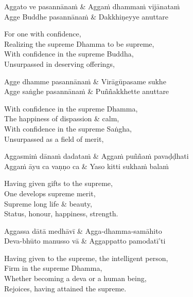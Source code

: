 \begin{twochants}
  Aggato ve pasannānaṁ & Aggaṁ dhammaṁ vijānataṁ\\
  Agge Buddhe pasannānaṁ & Dakkhiṇeyye anuttare\\
\end{twochants}

\begin{english}
  For one with confidence,\\
  Realizing the supreme Dhamma to be supreme,\\
  With confidence in the supreme Buddha,\\
  Unsurpassed in deserving offerings,
\end{english}

\begin{twochants}
  Agge dhamme pasannānaṁ & Virāgūpasame sukhe\\
  Agge saṅghe pasannānaṁ & Puññakkhette anuttare\\
\end{twochants}

\begin{english}
  With confidence in the supreme Dhamma,\\
  The happiness of dispassion \& calm,\\
  With confidence in the supreme Saṅgha,\\
  Unsurpassed as a field of merit,
\end{english}

\begin{twochants}
  Aggasmiṁ dānaṁ dadataṁ & Aggaṁ puññaṁ pavaḍḍhati\\
  Aggaṁ āyu ca vaṇṇo ca & Yaso kitti sukhaṁ balaṁ
\end{twochants}

\begin{english}
  Having given gifts to the supreme,\\
  One develops supreme merit,\\
  Supreme long life \& beauty,\\
  Status, honour, happiness, strength.
\end{english}

\begin{twochants}
  Aggassa dātā medhāvī & Agga-dhamma-samāhito\\
  Deva-bhūto manusso vā & Aggappatto pamodatī'ti
\end{twochants}

\begin{english}
  Having given to the supreme, the intelligent person,\\
  Firm in the supreme Dhamma,\\
  Whether becoming a deva or a human being,\\
  Rejoices, having attained the supreme.
\end{english}

